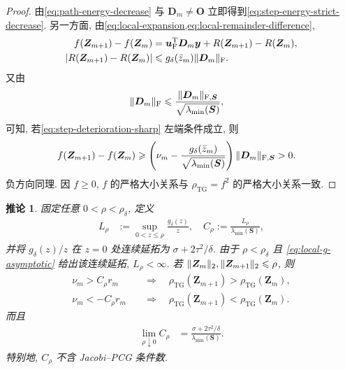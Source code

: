 \documentclass{ctexart}
\newcommand{\q}{\quad}
\newcommand{\T}{\mathrm{T}}
\newcommand{\dt}{\delta}
\renewcommand{\ge}{\geqslant}
\renewcommand{\le}{\leqslant}
\DeclarePairedDelimiter\norm{\lVert}{\rVert}
\DeclarePairedDelimiter\abs{\lvert}{\rvert}
\newtheorem{corollary}[theorem]{推论}
\begin{document}
\begin{proof}
由\cref{eq:path-energy-decrease} 与 $\bm D_m\ne\mathbf O$ 立即得到\cref{eq:step-energy-strict-decrease}. 另一方面, 由\cref{eq:local-expansion,eq:local-remainder-difference},
\begin{align}
    f(\bm Z_{m+1})-f(\bm Z_m)
    &=\bm u_{\mathrm F}^\T\bm D_m\bm y
      +R(\bm Z_{m+1})-R(\bm Z_m),
    \label{eq:step-f-difference}\\
    \abs*{R(\bm Z_{m+1})-R(\bm Z_m)}
    &\le g_\dt(\bar z_m)\norm{\bm D_m}_{\mathrm F}.
    \label{eq:step-remainder-difference-bound}
\end{align}
又由
\begin{align}
    \norm{\bm D_m}_{\mathrm F}
    &\le\frac{\norm{\bm D_m}_{\mathrm F,\bm S}}
    {\sqrt{\lambda_{\min}(\bm S)}},
    \label{eq:step-F-by-S}
\end{align}
可知, 若\cref{eq:step-deterioration-sharp} 左端条件成立, 则
\begin{align}
    f(\bm Z_{m+1})-f(\bm Z_m)
    &\ge\left(
      \nu_m-\frac{g_\dt(\bar z_m)}{\sqrt{\lambda_{\min}(\bm S)}}
      \right)
      \norm{\bm D_m}_{\mathrm F,\bm S}>0.
    \label{eq:step-deterioration-sharp-proof}
\end{align}
负方向同理. 因 $f\ge0$, $f$ 的严格大小关系与 $\rho_{\mathrm{TG}}=f^2$ 的严格大小关系一致.
\end{proof}

\begin{corollary}
\label{cor:pcg-Crho-criterion}
固定任意 $0<\rho<\rho_\dt$, 定义
\begin{align}
    L_\rho&:=\sup_{0<z\le\rho}\frac{g_\dt(z)}{z},\q
    C_\rho:=\frac{L_\rho}{\lambda_{\min}(\bm S)},
    \label{eq:sharp-Crho-definition}
\end{align}
并将 $g_\dt(z)/z$ 在 $z=0$ 处连续延拓为
$\sigma+2\tau^2/\dt$. 由于 $\rho<\rho_\dt$ 且
\cref{eq:local-g-asymptotic} 给出该连续延拓, $L_\rho<\infty$.
若
$\norm{\bm Z_m}_2,\norm{\bm Z_{m+1}}_2\le\rho$, 则
\begin{align}
    \nu_m>C_\rho r_m
    &\q\Longrightarrow\q
    \rho_{\mathrm{TG}}(\bm Z_{m+1})>\rho_{\mathrm{TG}}(\bm Z_m),
    \label{eq:step-deterioration-Crho}\\
    \nu_m<-C_\rho r_m
    &\q\Longrightarrow\q
    \rho_{\mathrm{TG}}(\bm Z_{m+1})<\rho_{\mathrm{TG}}(\bm Z_m).
    \label{eq:step-improvement-Crho}
\end{align}
而且
\begin{align}
    \lim_{\rho\downarrow0}C_\rho
    &=\frac{\sigma+2\tau^2/\dt}{\lambda_{\min}(\bm S)}.
    \label{eq:sharp-Crho-asymptotic}
\end{align}
特别地, $C_\rho$ 不含 Jacobi--PCG 条件数.
\end{corollary}
\end{document}
